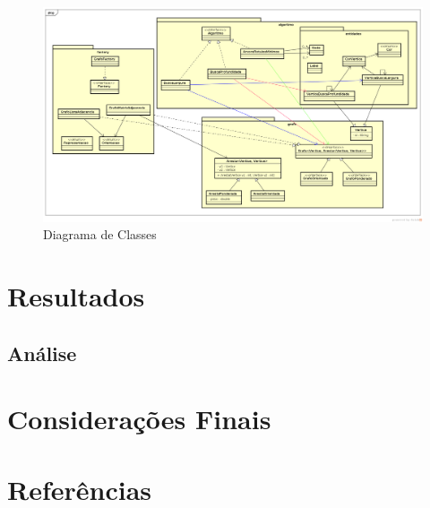 \documentclass[12pt]{article}
\begin{document}
\begin{landscape}
\centering
\begin{figure}[p]
\includegraphics[width=1.4\textwidth]{ClassDiagram.png}
\caption{Diagrama de Classes}
\label{fig:classDiagram}
\end{figure}
\end{landscape}
\restoregeometry

\section{Resultados}\label{sec:resultados}

\subsection{Análise}\label{sec:analise}

\section{Considerações Finais}\label{sec:conclusao}

\section{Referências}\label{sec:referencia}
\end{document}
